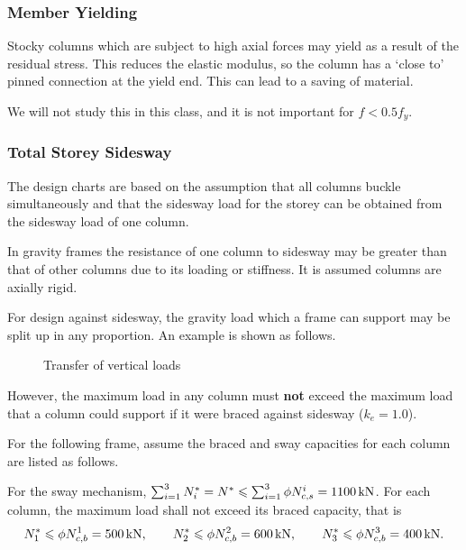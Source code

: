 \subsubsection{Member Yielding}
Stocky columns which are subject to high axial forces may yield as a result of the residual stress.
This reduces the elastic modulus, so the column has a `close to' pinned connection at the yield end.
This can lead to a saving of material.

We will not study this in this class, and it is not important for $f<0.5f_y$.
\subsubsection{Total Storey Sidesway}
The design charts are based on the assumption that all columns buckle simultaneously and that the sidesway load for the storey can be obtained from the sidesway load of one column.

In gravity frames the resistance of one column to sidesway may be greater than that of other columns due to its loading or stiffness.
It is assumed columns are axially rigid.

For design against sidesway, the gravity load which a frame can support may be split up in any proportion.
An example is shown as follows.
\begin{figure}[H]
\centering
\caption{Transfer of vertical loads}
\end{figure}

However, the maximum load in any column must \textbf{not} exceed the maximum load that a column could support if it were braced against sidesway ($k_e=1.0$).

For the following frame, assume the braced and sway capacities for each column are listed as follows.
\begin{figure}[H]
\centering
\end{figure}
For the sway mechanism, $\sum_{i=1}^3N^*_i=N^*\leqslant\sum_{i=1}^3\phi{}N_{c,s}^i=\SI{1100}{\kilo\newton}$.
For each column, the maximum load shall not exceed its braced capacity, that is
\begin{gather*}
N^*_1\leqslant\phi{}N_{c,b}^1=\SI{500}{\kilo\newton},\qquad
N^*_2\leqslant\phi{}N_{c,b}^2=\SI{600}{\kilo\newton},\qquad
N^*_3\leqslant\phi{}N_{c,b}^3=\SI{400}{\kilo\newton}.
\end{gather*}

